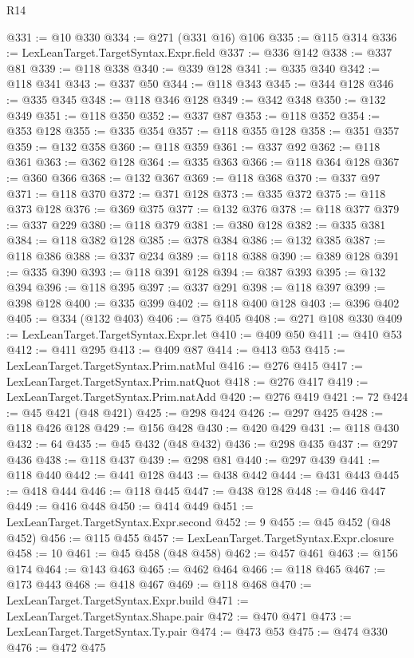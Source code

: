 \begin{lexlean}{R14}
\begin{coremodule}
{{{{{{{{{{{{{{{{{{{{{{{{{{{{{{{{{{{{{{{{{{{{{{{{{{{{{{{{{{{{{{{{{{{{{{{{{{{{{{{{{{@331 := @10 @330
@334 := @271 (@331 @16) @106
@335 := @115 @314
@336 := LexLeanTarget.TargetSyntax.Expr.field
@337 := @336 @142
@338 := @337 @81
@339 := @118 @338
@340 := @339 @128
@341 := @335 @340
@342 := @118 @341
@343 := @337 @50
@344 := @118 @343
@345 := @344 @128
@346 := @335 @345
@348 := @118 @346 @128
@349 := @342 @348
@350 := @132 @349
@351 := @118 @350
@352 := @337 @87
@353 := @118 @352
@354 := @353 @128
@355 := @335 @354
@357 := @118 @355 @128
@358 := @351 @357
@359 := @132 @358
@360 := @118 @359
@361 := @337 @92
@362 := @118 @361
@363 := @362 @128
@364 := @335 @363
@366 := @118 @364 @128
@367 := @360 @366
@368 := @132 @367
@369 := @118 @368
@370 := @337 @97
@371 := @118 @370
@372 := @371 @128
@373 := @335 @372
@375 := @118 @373 @128
@376 := @369 @375
@377 := @132 @376
@378 := @118 @377
@379 := @337 @229
@380 := @118 @379
@381 := @380 @128
@382 := @335 @381
@384 := @118 @382 @128
@385 := @378 @384
@386 := @132 @385
@387 := @118 @386
@388 := @337 @234
@389 := @118 @388
@390 := @389 @128
@391 := @335 @390
@393 := @118 @391 @128
@394 := @387 @393
@395 := @132 @394
@396 := @118 @395
@397 := @337 @291
@398 := @118 @397
@399 := @398 @128
@400 := @335 @399
@402 := @118 @400 @128
@403 := @396 @402
@405 := @334 (@132 @403)
@406 := @75 @405
@408 := @271 @108 @330
@409 := LexLeanTarget.TargetSyntax.Expr.let
@410 := @409 @50
@411 := @410 @53
@412 := @411 @295
@413 := @409 @87
@414 := @413 @53
@415 := LexLeanTarget.TargetSyntax.Prim.natMul
@416 := @276 @415
@417 := LexLeanTarget.TargetSyntax.Prim.natQuot
@418 := @276 @417
@419 := LexLeanTarget.TargetSyntax.Prim.natAdd
@420 := @276 @419
@421 := 72
@424 := @45 @421 (@48 @421)
@425 := @298 @424
@426 := @297 @425
@428 := @118 @426 @128
@429 := @156 @428
@430 := @420 @429
@431 := @118 @430
@432 := 64
@435 := @45 @432 (@48 @432)
@436 := @298 @435
@437 := @297 @436
@438 := @118 @437
@439 := @298 @81
@440 := @297 @439
@441 := @118 @440
@442 := @441 @128
@443 := @438 @442
@444 := @431 @443
@445 := @418 @444
@446 := @118 @445
@447 := @438 @128
@448 := @446 @447
@449 := @416 @448
@450 := @414 @449
@451 := LexLeanTarget.TargetSyntax.Expr.second
@452 := 9
@455 := @45 @452 (@48 @452)
@456 := @115 @455
@457 := LexLeanTarget.TargetSyntax.Expr.closure
@458 := 10
@461 := @45 @458 (@48 @458)
@462 := @457 @461
@463 := @156 @174
@464 := @143 @463
@465 := @462 @464
@466 := @118 @465
@467 := @173 @443
@468 := @418 @467
@469 := @118 @468
@470 := LexLeanTarget.TargetSyntax.Expr.build
@471 := LexLeanTarget.TargetSyntax.Shape.pair
@472 := @470 @471
@473 := LexLeanTarget.TargetSyntax.Ty.pair
@474 := @473 @53
@475 := @474 @330
@476 := @472 @475
}}}}}}}}}}}}}}}}}}}}}}}}}}}}}}}}}}}}}}}}}}}}}}}}}}}}}}}}}}}}}}}}}}}}}}}}}}}}}}}}}}
\end{coremodule}
\end{lexlean}
